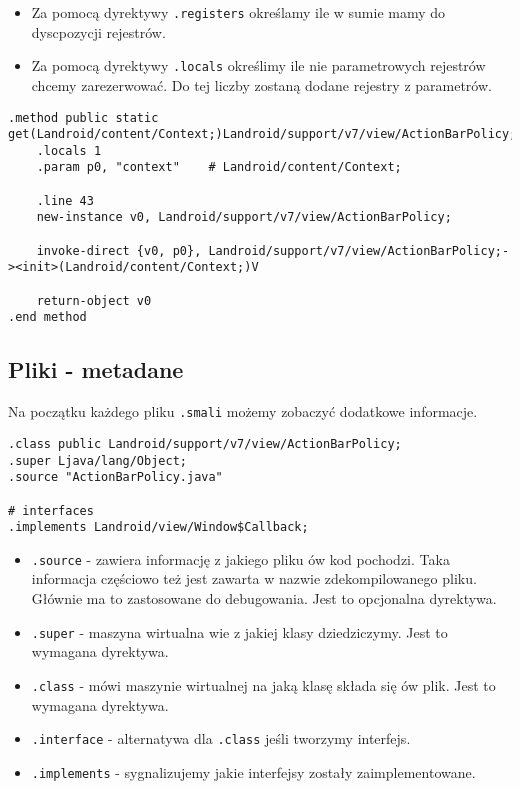 \documentclass[12pt,a4paper,leqno,oneside,titlepage]{book}
\begin{document}
\begin{itemize}
\item Za pomocą dyrektywy \verb|.registers| określamy ile w sumie mamy do dyscpozycji rejestrów.
\item Za pomocą dyrektywy \verb|.locals| określimy ile nie parametrowych rejestrów chcemy zarezerwować. Do tej liczby zostaną dodane rejestry z parametrów.
\end{itemize}
%
\begin{lstlisting}[language=smali,captionpos=b,caption={Smali}]
.method public static get(Landroid/content/Context;)Landroid/support/v7/view/ActionBarPolicy;
    .locals 1
    .param p0, "context"    # Landroid/content/Context;

    .line 43
    new-instance v0, Landroid/support/v7/view/ActionBarPolicy;

    invoke-direct {v0, p0}, Landroid/support/v7/view/ActionBarPolicy;-><init>(Landroid/content/Context;)V

    return-object v0
.end method
\end{lstlisting}
%
\subsection{Pliki - metadane}
%
Na początku każdego pliku \verb|.smali| możemy zobaczyć dodatkowe informacje.
%
\begin{lstlisting}[language=smali,captionpos=b,caption={Smali}]
.class public Landroid/support/v7/view/ActionBarPolicy;
.super Ljava/lang/Object;
.source "ActionBarPolicy.java"

# interfaces
.implements Landroid/view/Window$Callback;
\end{lstlisting}
%
\begin{itemize}
\item \verb|.source| - zawiera informację z jakiego pliku ów kod pochodzi. Taka informacja częściowo też jest zawarta w nazwie zdekompilowanego pliku. Głównie ma to zastosowane do debugowania. Jest to opcjonalna dyrektywa.
\item \verb|.super| - maszyna wirtualna wie z jakiej klasy dziedziczymy. Jest to wymagana dyrektywa.
\item \verb|.class| - mówi maszynie wirtualnej na jaką klasę składa się ów plik. Jest to wymagana dyrektywa.
\item \verb|.interface| - alternatywa dla \verb|.class| jeśli tworzymy interfejs.
\item \verb|.implements| - sygnalizujemy jakie interfejsy zostały zaimplementowane.
\end{itemize}
\end{document}
